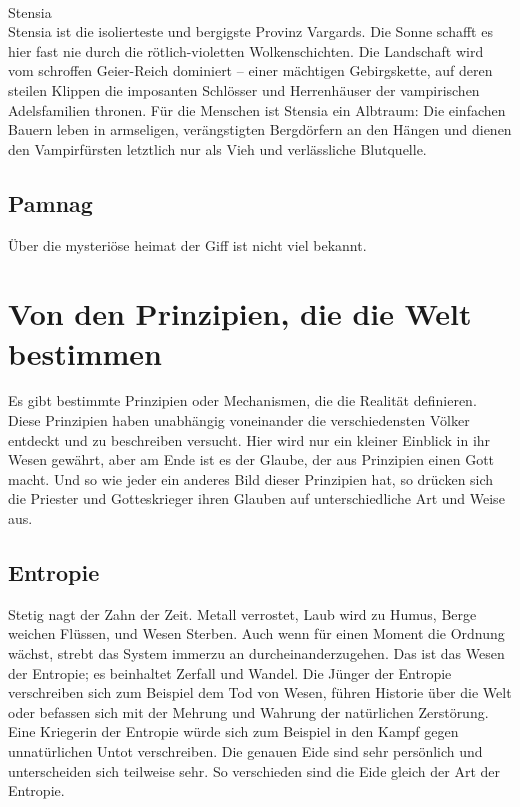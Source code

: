 \documentclass{book}
\begin{document}
\\
Stensia\\
Stensia ist die isolierteste und bergigste Provinz Vargards. Die Sonne schafft es hier fast nie durch die rötlich-violetten Wolkenschichten. Die Landschaft wird vom schroffen Geier-Reich dominiert – einer mächtigen Gebirgskette, auf deren steilen Klippen die imposanten Schlösser und Herrenhäuser der vampirischen Adelsfamilien thronen. Für die Menschen ist Stensia ein Albtraum: Die einfachen Bauern leben in armseligen, verängstigten Bergdörfern an den Hängen und dienen den Vampirfürsten letztlich nur als Vieh und verlässliche Blutquelle.\\

    \section{Pamnag}
Über die mysteriöse heimat der Giff ist nicht viel bekannt.



\chapter{Von den Prinzipien, die die Welt bestimmen}
Es gibt bestimmte Prinzipien oder Mechanismen, die die Realität definieren. Diese Prinzipien haben unabhängig voneinander die verschiedensten Völker entdeckt und zu beschreiben versucht. Hier wird nur ein kleiner Einblick in ihr Wesen gewährt, aber am Ende ist es der Glaube, der aus Prinzipien einen Gott macht. Und so wie jeder ein anderes Bild dieser Prinzipien hat, so drücken sich die Priester und Gotteskrieger ihren Glauben auf unterschiedliche Art und Weise aus.

\section{Entropie}
Stetig nagt der Zahn der Zeit. Metall verrostet, Laub wird zu Humus, Berge weichen Flüssen, und Wesen Sterben. Auch wenn für einen Moment die Ordnung wächst, strebt das System immerzu an durcheinanderzugehen. Das ist das Wesen der Entropie; es beinhaltet Zerfall und Wandel. Die Jünger der Entropie verschreiben sich zum Beispiel dem Tod von Wesen, führen Historie über die Welt oder befassen sich mit der Mehrung und Wahrung der natürlichen Zerstörung. Eine Kriegerin der Entropie würde sich zum Beispiel in den Kampf gegen unnatürlichen Untot verschreiben. Die genauen Eide sind sehr persönlich und unterscheiden sich teilweise sehr. So verschieden sind die Eide gleich der Art der Entropie.
\end{document}
